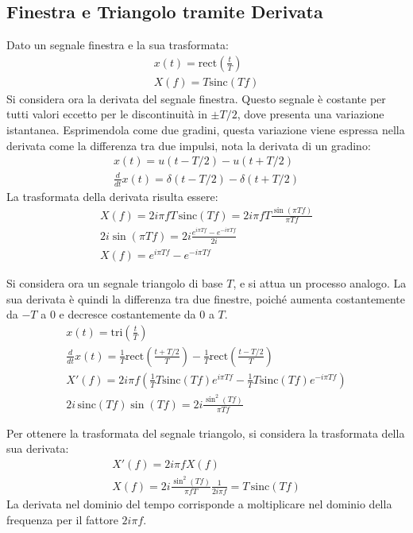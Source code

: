 \documentclass{article}
\numberwithin{equation}{subsection}
\begin{document}
\subsection{Finestra e Triangolo tramite Derivata}
Dato un segnale finestra e la sua trasformata:
\begin{gather*}
    x(t)=\mbox{rect}\displaystyle\left(\frac{t}{T}\right)\\
    X(f)=T\mbox{sinc}\displaystyle\left(Tf\right)
\end{gather*}
Si considera ora la derivata del segnale finestra. Questo segnale è costante per tutti valori eccetto per le discontinuità in $\pm T/2$, dove presenta una variazione istantanea. 
Esprimendola come due gradini, questa variazione viene espressa nella derivata come la differenza tra due impulsi, nota la derivata di un gradino: 
\begin{gather*}
    x(t)=u(t-T/2)-u(t+T/2)\\
    \displaystyle\frac{d}{dt}x(t)=\delta(t-T/2)-\delta(t+T/2)
\end{gather*}
La trasformata della derivata risulta essere:
\begin{gather*}
    X(f)=2i\pi fT\,\mbox{sinc}(Tf)=\displaystyle2i\pi fT\frac{\sin(\pi Tf)}{\pi Tf}\\
    2i\sin(\pi Tf)=2i\frac{e^{i\pi Tf}-e^{-i\pi Tf}}{2i}\\
    X(f)=e^{i\pi Tf}-e^{-i\pi Tf}
\end{gather*}


Si considera ora un segnale triangolo di base $T$, e si attua un processo analogo. La sua derivata è quindi la differenza tra due finestre, poiché aumenta costantemente da 
$-T$ a $0$ e decresce costantemente da $0$ a $T$. 
\begin{gather*}
    x(t)=\mbox{tri}\displaystyle\left(\frac{t}{T}\right)\\
    \displaystyle\frac{d}{dt}x(t)=\frac{1}{T}\mbox{rect}\left(\frac{t+T/2}{T}\right)-\frac{1}{T}\mbox{rect}\left(\frac{t-T/2}{T}\right)\\
    X'(f)=2i\pi f\displaystyle\left(\frac{1}{T}T\mbox{sinc}(Tf)e^{i\pi Tf}-\frac{1}{T}T\mbox{sinc}(Tf)e^{-i\pi Tf}\right)\\
    2i\,\mbox{sinc}(Tf)\sin(Tf)=\displaystyle2i\frac{\sin^2(Tf)}{\pi Tf}
\end{gather*}

Per ottenere la trasformata del segnale triangolo, si considera la trasformata della sua derivata:
\begin{gather*}
    X'(f)=2i\pi fX(f)\\
    X(f)=\displaystyle2i\frac{\sin^2(Tf)}{\pi fT}\frac{1}{2i\pi f}=T\,\mbox{sinc}(Tf)
\end{gather*}
La derivata nel dominio del tempo corrisponde a moltiplicare nel dominio della frequenza per il fattore $2i\pi f$. 
\end{document}

